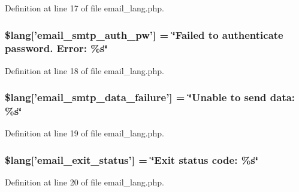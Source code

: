 Definition at line 17 of file email\-\_\-lang.\-php.

\hypertarget{email__lang_8php_a09fd123f0d251a8eac845f985c6583c3}{
\subsubsection[{\$lang}]{\setlength{\rightskip}{0pt plus 5cm}\$lang\mbox{[}'email\-\_\-smtp\-\_\-auth\-\_\-pw'\mbox{]} = \char`\"{}Failed {\bf to} authenticate password. Error\-: \%s\char`\"{}}}\label{email__lang_8php_a09fd123f0d251a8eac845f985c6583c3}


Definition at line 18 of file email\-\_\-lang.\-php.

\hypertarget{email__lang_8php_a59801e23c2d745400384098c7bf0a6dc}{
\subsubsection[{\$lang}]{\setlength{\rightskip}{0pt plus 5cm}\$lang\mbox{[}'email\-\_\-smtp\-\_\-data\-\_\-failure'\mbox{]} = \char`\"{}Unable {\bf to} send data\-: \%s\char`\"{}}}\label{email__lang_8php_a59801e23c2d745400384098c7bf0a6dc}


Definition at line 19 of file email\-\_\-lang.\-php.

\hypertarget{email__lang_8php_a32b0c2f50acd03defc88df937ee2877f}{
\subsubsection[{\$lang}]{\setlength{\rightskip}{0pt plus 5cm}\$lang\mbox{[}'email\-\_\-exit\-\_\-status'\mbox{]} = \char`\"{}Exit status code\-: \%s\char`\"{}}}\label{email__lang_8php_a32b0c2f50acd03defc88df937ee2877f}


Definition at line 20 of file email\-\_\-lang.\-php.

